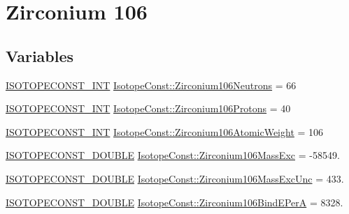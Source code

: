 \hypertarget{group___isotope_const-_zirconium-_zr106}{}\section{Zirconium 106}
\label{group___isotope_const-_zirconium-_zr106}
\subsection*{Variables}
\begin{DoxyCompactItemize}
\item 
\mbox{\hyperlink{group___isotope_const-_macros_ga5f18360b3e99483a35c32d789e62621c}{I\+S\+O\+T\+O\+P\+E\+C\+O\+N\+S\+T\+\_\+\+I\+NT}} \mbox{\hyperlink{group___isotope_const-_zirconium-_zr106_gaa1214cfedeafaee91ffdf6cbdd7ec228}{Isotope\+Const\+::\+Zirconium106\+Neutrons}} = 66
\item 
\mbox{\hyperlink{group___isotope_const-_macros_ga5f18360b3e99483a35c32d789e62621c}{I\+S\+O\+T\+O\+P\+E\+C\+O\+N\+S\+T\+\_\+\+I\+NT}} \mbox{\hyperlink{group___isotope_const-_zirconium-_zr106_ga93d61d2bfe002ffacd01eededc04a6d9}{Isotope\+Const\+::\+Zirconium106\+Protons}} = 40
\item 
\mbox{\hyperlink{group___isotope_const-_macros_ga5f18360b3e99483a35c32d789e62621c}{I\+S\+O\+T\+O\+P\+E\+C\+O\+N\+S\+T\+\_\+\+I\+NT}} \mbox{\hyperlink{group___isotope_const-_zirconium-_zr106_ga896618867ae855098f49774577083b8f}{Isotope\+Const\+::\+Zirconium106\+Atomic\+Weight}} = 106
\item 
\mbox{\hyperlink{group___isotope_const-_macros_ga8f45a7272ce02c0b4c65c44636ed719a}{I\+S\+O\+T\+O\+P\+E\+C\+O\+N\+S\+T\+\_\+\+D\+O\+U\+B\+LE}} \mbox{\hyperlink{group___isotope_const-_zirconium-_zr106_ga0ae2711e6a9c9052a96727241bb88edd}{Isotope\+Const\+::\+Zirconium106\+Mass\+Exc}} = -\/58549.
\item 
\mbox{\hyperlink{group___isotope_const-_macros_ga8f45a7272ce02c0b4c65c44636ed719a}{I\+S\+O\+T\+O\+P\+E\+C\+O\+N\+S\+T\+\_\+\+D\+O\+U\+B\+LE}} \mbox{\hyperlink{group___isotope_const-_zirconium-_zr106_gad6d9c26e31bd973c6ae59244b46f261e}{Isotope\+Const\+::\+Zirconium106\+Mass\+Exc\+Unc}} = 433.
\item 
\mbox{\hyperlink{group___isotope_const-_macros_ga8f45a7272ce02c0b4c65c44636ed719a}{I\+S\+O\+T\+O\+P\+E\+C\+O\+N\+S\+T\+\_\+\+D\+O\+U\+B\+LE}} \mbox{\hyperlink{group___isotope_const-_zirconium-_zr106_ga067b136803f190480b3704082d4622de}{Isotope\+Const\+::\+Zirconium106\+Bind\+E\+PerA}} = 8328.
\item 

\end{DoxyCompactItemize}
